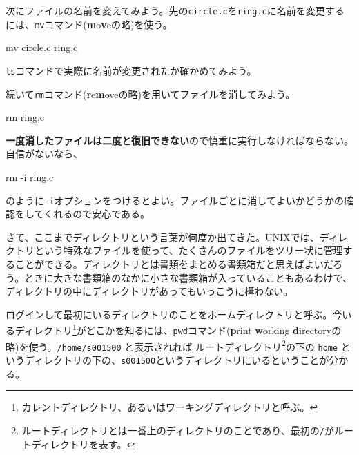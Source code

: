 次にファイルの名前を変えてみよう。先の\texttt{circle.c}を\texttt{ring.c}に名前を変更するには、\texttt{mv}コマンド(\textbf{m}o\textbf{v}eの略)を使う。
\begin{commandline2}
    \prompt \underline{mv circle.c ring.c}
\end{commandline2} \noindent
\texttt{ls}コマンドで実際に名前が変更されたか確かめてみよう。

続いて\texttt{rm}コマンド(\textbf{r}e\textbf{m}oveの略)を用いてファイルを消してみよう。
\begin{commandline2}
    \prompt \underline{rm ring.c}
\end{commandline2} \noindent
\textbf{一度消したファイルは二度と復旧できない}ので慎重に実行しなければならない。自信がないなら、
\begin{commandline2}
    \prompt \underline{rm -i ring.c}
\end{commandline2} \noindent
のように\texttt{-i}オプションをつけるとよい。ファイルごとに消してよいかどうかの確認をしてくれるので安心である。

さて、ここまでディレクトリという言葉が何度か出てきた。UNIXでは、ディレクトリという特殊なファイルを使って、たくさんのファイルをツリー状に管理することができる。ディレクトリとは書類をまとめる書類箱だと思えばよいだろう。ときに大きな書類箱のなかに小さな書類箱が入っていることもあるわけで、ディレクトリの中にディレクトリがあってもいっこうに構わない。

ログインして最初にいるディレクトリのことをホームディレクトリと呼ぶ。今いるディレクトリ\footnote{カレントディレクトリ、あるいはワーキングディレクトリと呼ぶ。}がどこかを知るには、\texttt{pwd}コマンド(\textbf{p}rint \textbf{w}orking \textbf{d}irectoryの略)を使う。\texttt{/home/s001500} と表示されれば ルートディレクトリ\footnote{ルートディレクトリとは一番上のディレクトリのことであり、最初の\texttt{/}がルートディレクトリを表す。}の下の \texttt{home} というディレクトリの下の、\texttt{s001500}というディレクトリにいるということが分かる。

